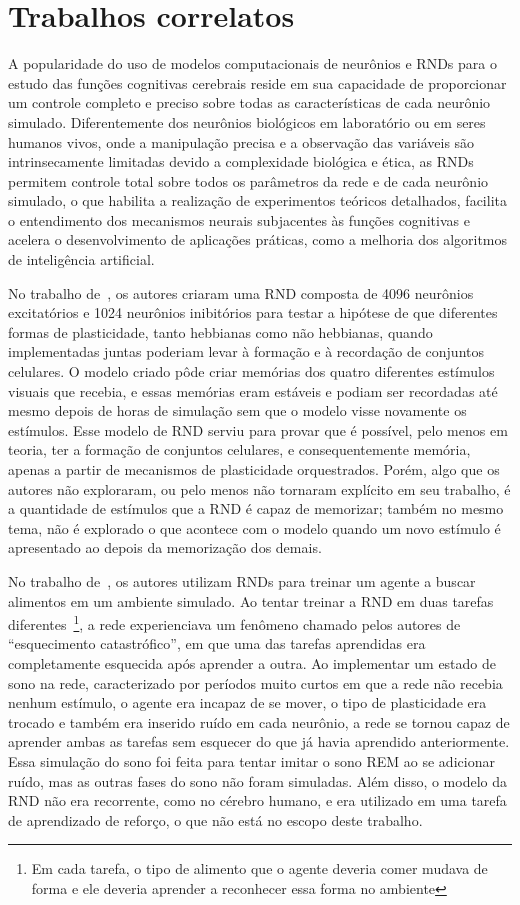 \chapter{Trabalhos correlatos}

A popularidade do uso de modelos computacionais de neurônios e RNDs para o estudo das funções cognitivas cerebrais reside em sua
capacidade de proporcionar um controle completo e preciso sobre todas as características de cada neurônio simulado. Diferentemente
dos neurônios biológicos em laboratório ou em seres humanos vivos, onde a manipulação precisa e a observação das variáveis são
intrinsecamente limitadas devido a complexidade biológica e ética, as RNDs permitem controle total sobre todos os parâmetros da
rede e de cada neurônio simulado, o que habilita a realização de experimentos teóricos detalhados, facilita o entendimento dos
mecanismos neurais subjacentes às funções cognitivas e acelera o desenvolvimento de aplicações práticas, como a melhoria dos
algoritmos de inteligência artificial. 

No trabalho de~\cite{zenkeDiverse2015}, os autores criaram uma RND composta de 4096 neurônios excitatórios e 1024 neurônios inibitórios para
testar a hipótese de que diferentes formas de plasticidade, tanto hebbianas como não hebbianas, quando implementadas juntas
poderiam levar à formação e à recordação de conjuntos celulares. O modelo criado pôde criar memórias dos quatro diferentes
estímulos visuais que recebia, e essas memórias eram estáveis e podiam ser recordadas até mesmo depois de horas de simulação sem
que o modelo visse novamente os estímulos. Esse modelo de RND serviu para provar que é possível, pelo menos em teoria, ter a
formação de conjuntos celulares, e consequentemente memória, apenas a partir de mecanismos de plasticidade orquestrados. Porém,
algo que os autores não exploraram, ou pelo menos não tornaram explícito em seu trabalho, é a quantidade de estímulos que a RND é
capaz de memorizar; também no mesmo tema, não é explorado o que acontece com o modelo quando um novo estímulo é apresentado ao
depois da memorização dos demais.

No trabalho de~\cite{goldenSleep2022}, os autores utilizam RNDs para treinar um agente a buscar alimentos em um ambiente simulado.
Ao tentar treinar a RND em duas tarefas diferentes~\footnote{Em cada tarefa, o tipo de alimento que o agente deveria comer mudava
de forma e ele deveria aprender a reconhecer essa forma no ambiente}, a rede experienciava um fenômeno chamado pelos autores de
``esquecimento catastrófico'', em que uma das tarefas aprendidas era completamente esquecida após aprender a outra. Ao implementar
um estado de sono na rede, caracterizado por períodos muito curtos em que a rede não recebia nenhum estímulo, o agente era incapaz
de se mover, o tipo de plasticidade era trocado e também era inserido ruído em cada neurônio, a rede se tornou capaz de aprender
ambas as tarefas sem esquecer do que já havia aprendido anteriormente. Essa simulação do sono foi feita para tentar imitar o sono
REM ao se adicionar ruído, mas as outras fases do sono não foram simuladas. Além disso, o modelo da RND não era recorrente, como
no cérebro humano, e era utilizado em uma tarefa de aprendizado de reforço, o que não está no escopo deste trabalho.

